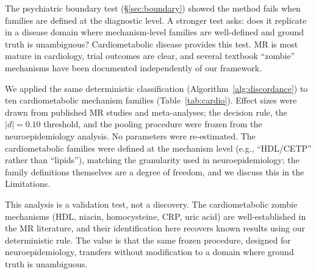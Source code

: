 \documentclass[11pt]{article}
\begin{document}
The psychiatric boundary test (\S\ref{sec:boundary}) showed the method fails when families are defined at the diagnostic level. A stronger test asks: does it replicate in a disease domain where mechanism-level families are well-defined and ground truth is unambiguous? Cardiometabolic disease provides this test. MR is most mature in cardiology, trial outcomes are clear, and several textbook ``zombie'' mechanisms have been documented independently of our framework.

We applied the same deterministic classification (Algorithm~\ref{alg:discordance}) to ten cardiometabolic mechanism families (Table~\ref{tab:cardio}). Effect sizes were drawn from published MR studies and meta-analyses; the decision rule, the $|d| = 0.10$ threshold, and the pooling procedure were frozen from the neuroepidemiology analysis. No parameters were re-estimated. The cardiometabolic families were defined at the mechanism level (e.g., ``HDL/CETP'' rather than ``lipids''), matching the granularity used in neuroepidemiology; the family definitions themselves are a degree of freedom, and we discuss this in the Limitations.

This analysis is a validation test, not a discovery. The cardiometabolic zombie mechanisms (HDL, niacin, homocysteine, CRP, uric acid) are well-established in the MR literature, and their identification here recovers known results using our deterministic rule. The value is that the same frozen procedure, designed for neuroepidemiology, transfers without modification to a domain where ground truth is unambiguous.
\end{document}
